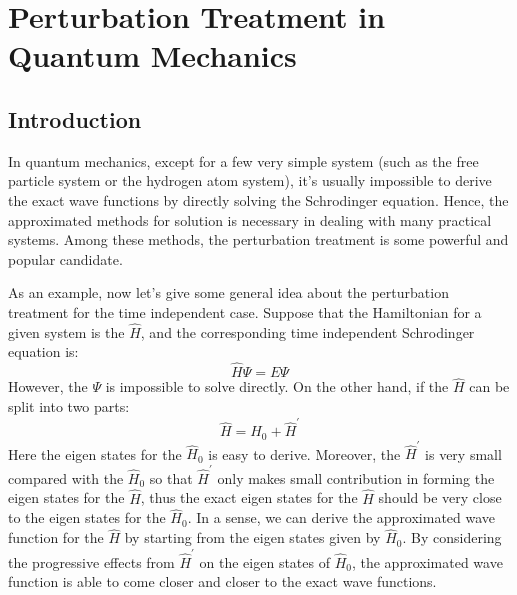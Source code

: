 %
%
%
\chapter{Perturbation Treatment in Quantum Mechanics}
%
%
%
%
\section{Introduction}
%
%
In quantum mechanics, except for a few very simple system (such as
the free particle system or the hydrogen atom system), it's usually
impossible to derive the exact wave functions by directly solving
the Schrodinger equation. Hence, the approximated methods for
solution is necessary in dealing with many practical systems. Among
these methods, the perturbation treatment is some powerful and
popular candidate.

As an example, now let's give some general idea about the
perturbation treatment for the time independent case. Suppose that
the Hamiltonian for a given system is the $\hat{H}$, and the
corresponding time independent Schrodinger equation is:
\begin{equation}\label{}
\hat{H}\Psi = E\Psi
\end{equation}
However, the $\Psi$ is impossible to solve directly. On the other
hand, if the $\hat{H}$ can be split into two parts:
\begin{equation}\label{PTIQMeq:4}
\hat{H} = \hat{H}_{0} + \hat{H}^{'}
\end{equation}
Here the eigen states for the $\hat{H}_{0}$ is easy to derive.
Moreover, the $\hat{H}^{'}$ is very small compared with the
$\hat{H}_{0}$ so that $\hat{H}^{'}$ only makes small contribution in
forming the eigen states for the $\hat{H}$, thus the exact eigen
states for the $\hat{H}$ should be very close to the eigen states
for the $\hat{H}_{0}$. In a sense, we can derive the approximated
wave function for the $\hat{H}$ by starting from the eigen states
given by $\hat{H}_{0}$. By considering the progressive effects from
$\hat{H}^{'}$ on the eigen states of $\hat{H}_{0}$, the approximated
wave function is able to come closer and closer to the exact wave
functions.

